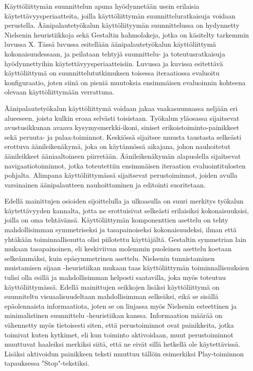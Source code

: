 \documentclass[utf8]{gradu3}
\begin{document}
Käyttöliittymän suunnittelun apuna hyödynnetään usein erilaisia käytettävyysperiaatteita, joilla käyttöliittymän suunnitteluratkaisuja voidaan perustella. Äänipalautetyökalun käyttöliityymän suunnittelussa on hydynnetty Nielsenin heuristiikkoja sekä Gestaltin hahmolakeja, jotka on käsitelty tarkemmin luvussa X. Tässä luvussa esitellään äänipalautetyökalun käyttöliittymä kokonaisuudessaan, ja peilataan tehtyjä suunnittelu- ja toteutusratkaisuja hyödynnettyihin käytettävyysperiaatteisiin. Luvussa ja kuvissa esitettävä käyttöliittymä on suunnittelututkimuksen toisessa iteraatiossa evaluoitu konfiguraatio, joten siinä on pieniä muutoksia ensimmäisen evaluoinnin kohteena olevaan käyttöliittymään verrattuna. 

Äänipalautetyökalun käyttöliittymä voidaan jakaa vaakasuunnassa neljään eri alueeseen, joista kulkin eroaa selvästi toisistaan. Työkalun yläosassa sijaitsevat avustusikkunan avaava kysymysmerkki-ikoni, siniset erikoistoiminto-painikkeet sekä peruuta- ja palaa-toiminnot. Keskiössä sijaitsee muusta taustasta selkeästi erottuva äänileikenäkymä, joka on käytännössä aikajana, johon nauhoitetut äänileikkeet ääniaaltoineen piirretään. Äänileikenäkymän alapuolella sijaitsevat navigaatiotoiminnot, jotka toteutettiin ensimmäisen iteraation evaluointitulosten pohjalta. Alimpana käyttöliittymässä sijaitsevat perustoiminnot, joiden avulla varsinainen äänipalautteen nauhoittaminen ja editointi suoritetaan. 

Edellä mainittujen osioiden sijoittelulla ja ulkoasulla on suuri merkitys työkalun käytettävyyden kannalta, jotta ne erottuisivat selkeästi erilaisiksi kokonaisuuksisi, joilla on oma tehtävänsä. Käyttöliittymän komponenttien asettelu on tehty mahdollisimman symmetriseksi ja tasapainoiseksi kokonaisuudeksi, ilman että yhtäkään toiminnallisuutta olisi piilotettu käyttäjältä. Gestaltin symmetrian lain mukaan tasapainoinen, eli keskiviivan molemmin puoleinen asettelu koetaan selkeämmäksi, kuin epäsymmetrinen asettelu. Nielsenin tunnistaminen muistamisen sijaan -heuristiikan mukaan taas käyttöliittymän toiminnallisuuksien tulisi olla esillä ja mahdollisimman helposti saatavilla, joka myös toteutuu käyttöliittymässä. Edellä mainittujen seikkojen lisäksi käyttöliittymä on suunniteltu visuaalisuudeltaan mahdollisimman selkeäksi, eikä se sisällä epäolennaista informaatiota, joten se on linjassa myös Nielsenin esteettinen ja minimalistinen suunnittelu -heuristiikan kanssa. Informaation määrää on vähennetty myös tietoisesti siten, että perustoiminnot ovat painikkeita, jotka toimivat kuten kytkimet, eli kun toiminto aktivoidaan, muut perustoiminnot muuttuvat haaleiksi merkiksi siitä, että ne eivät sillä hetkellä ole käytettävissä. Lisäksi aktivoidun painikkeen teksti muuttuu tällöin esimerkiksi Play-toiminnon tapauksessa "Stop"-tekstiksi.
\end{document}
